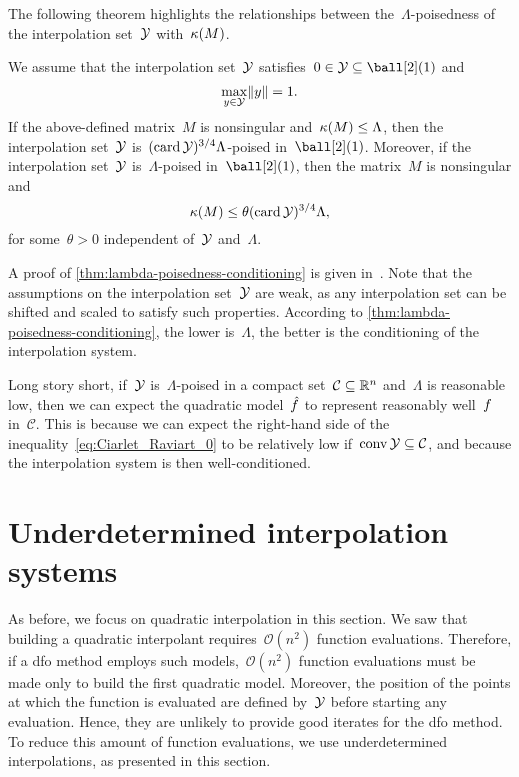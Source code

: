 The following theorem highlights the relationships between the~$\Lambda$-poisedness of the interpolation set~$\xpt$ with~$\operatorname{\kappa}(M)$.

\begin{theorem}
    \label{thm:lambda-poisedness-conditioning}
    We assume that the interpolation set~$\xpt$ satisfies~$0 \in \xpt \subseteq \ball[2](1)$ and
    \begin{equation*}
        \max_{y \in \xpt} \norm{y} = 1.
    \end{equation*}
    If the above-defined matrix~$M$ is nonsingular and~$\operatorname{\kappa}(M) \le \Lambda$, then the interpolation set~$\xpt$ is~$(\card \xpt)^{3/4} \Lambda$-poised in~$\ball[2](1)$.
    Moreover, if the interpolation set~$\xpt$ is~$\Lambda$-poised in~$\ball[2](1)$, then the matrix~$M$ is nonsingular and
    \begin{equation*}
        \cond(M) \le \theta (\card \xpt)^{3/4} \Lambda,
    \end{equation*}
    for some~$\theta > 0$ independent of~$\xpt$ and~$\Lambda$.
\end{theorem}

A proof of \cref{thm:lambda-poisedness-conditioning} is given in~\cite[\S~3.4]{Conn_Scheinberg_Vicente_2009b}.
Note that the assumptions on the interpolation set~$\xpt$ are weak, as any interpolation set can be shifted and scaled to satisfy such properties.
According to \cref{thm:lambda-poisedness-conditioning}, the lower is~$\Lambda$, the better is the conditioning of the interpolation system.

Long story short, if~$\xpt$ is~$\Lambda$-poised in a compact set~$\mathcal{C} \subseteq \mathbb{R}^n$ and~$\Lambda$ is reasonable low, then we can expect the quadratic model~$\objm$ to represent reasonably well~$f$ in~$\mathcal{C}$.
This is because we can expect the right-hand side of the inequality~\cref{eq:Ciarlet_Raviart_0} to be relatively low if~$\conv \xpt \subseteq \mathcal{C}$, and because the interpolation system is then well-conditioned.

\section{Underdetermined interpolation systems}
\label{sec:underdetermined-interpolation}

As before, we focus on quadratic interpolation in this section.
We saw that building a quadratic interpolant requires~$\mathcal{O}(n^2)$ function evaluations.
Therefore, if a \gls{dfo} method employs such models,~$\mathcal{O}(n^2)$ function evaluations must be made only to build the first quadratic model.
Moreover, the position of the points at which the function is evaluated are defined by~$\xpt$ before starting any evaluation.
Hence, they are unlikely to provide good iterates for the \gls{dfo} method.
To reduce this amount of function evaluations, we use underdetermined interpolations, as presented in this section.

